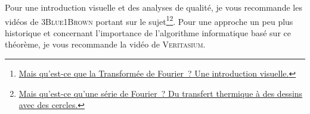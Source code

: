 \documentclass[../../main/main.tex]{subfiles}
\begin{document}

Pour une introduction visuelle et des analyses de qualité, je vous recommande
les vidéos de \textsc{3Blue1Brown} portant sur le
sujet\footnote{%
	\href{https://www.youtube.com/watch?v=spUNpyF58BY}%
	{Mais qu'est-ce que la Transformée de Fourier~? Une introduction visuelle.}
}\footnote{%
	\href{https://www.youtube.com/watch?v=r6sGWTCMz2k}%
	{Mais qu'est-ce qu'une série de Fourier~? Du transfert thermique à des
		dessins avec des cercles.}}. Pour
une approche un peu plus historique et concernant l'importance de l'algorithme
informatique basé sur ce théorème, je vous recommande la vidéo de
\textsc{Veritasium}.

\newpage



\end{document}
